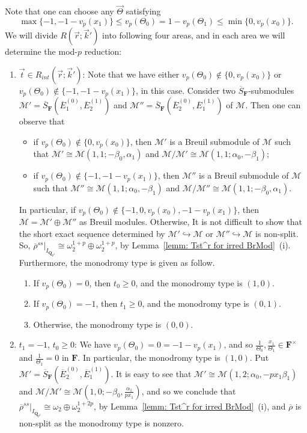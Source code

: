 \documentclass[11pt]{amsart}
\theoremstyle{definition}
\numberwithin{equation}{subsection}
\theoremstyle{plain}
\theoremstyle{plain}
\theoremstyle{plain}
\theoremstyle{plain}
\theoremstyle{plain}
\theoremstyle{plain}
\theoremstyle{plain}
\theoremstyle{plain}
\theoremstyle{plain}
\theoremstyle{plain}
\theoremstyle{plain}
\theoremstyle{plain}
\theoremstyle{definition}
\theoremstyle{definition}
\theoremstyle{definition}
\theoremstyle{remark}
\renewcommand{\(}{\textup{(}}
\renewcommand{\)}{\textup{)}}
\newcommand{\Q}{\mathbf{Q}}
\newcommand{\F}{\mathbf{F}}
\newcommand{\barS}{\overline{S}}
\newcommand{\rhobar}{\overline{\rho}}
\newcommand{\cM}{\mathcal{M}}
\newcommand{\barE}{\overline{E}}
\newcommand{\vr}{\vec{r}}
\newcommand{\vk}{\vec{k}}
\newcommand{\vTh}{\vec{\Theta}}
\newcommand{\IQptwo}{{I_{\Q_{p^2}}}}
\begin{document}
Note that one can choose any $\vTh$ satisfying
$$\max\{-1,-1-v_p(x_1)\}\leq v_p(\Theta_0)=1-v_p(\Theta_1)\leq \min\{0,v_p(x_0)\}.$$
We will divide $R(\vr;\vk')$ into following four areas, and in each area we will determine the mod-$p$ reduction:
\begin{enumerate}[leftmargin=*]
  \item $\vec{t}\in R_{int}(\vr;\vk')$: Note that we have either $v_p(\Theta_0)\not\in\{0,v_p(x_0)\}$ or $v_p(\Theta_0)\not\in\{-1,-1-v_p(x_1)\}$, in this case. Consider two $\barS_{\F}$-submodules    $\cM'=\barS_{\F}(\barE_1^{(0)},\barE_2^{(1)})$ and $\cM''=\barS_{\F}(\barE_2^{(0)},\barE_1^{(1)})$ of $\cM$. Then one can observe that
    \begin{itemize}[leftmargin=*]
      \item if $v_p(\Theta_0)\not\in\{0,v_p(x_0)\}$, then $\cM'$ is a Breuil submodule of $\cM$ such that $\cM'\cong\cM(1,1;-\beta_0,\alpha_1)$ and $\cM/\cM'\cong\cM(1,1;\alpha_0,-\beta_1)$;
      \item if $v_p(\Theta_0)\not\in\{-1,-1-v_p(x_1)\}$, then $\cM''$ is a Breuil submodule of $\cM$ such that $\cM''\cong\cM(1,1;\alpha_0,-\beta_1)$ and $\cM/\cM''\cong\cM(1,1;-\beta_0,\alpha_1)$.
    \end{itemize}
    In particular, if $v_p(\Theta_0)\not\in\{-1,0,v_p(x_0),-1-v_p(x_1)\}$, then $\cM=\cM'\oplus\cM''$ as Breuil modules. Otherwise, It is not difficult to show that the short exact sequence determined by $\cM'\hookrightarrow \cM$ or $\cM''\hookrightarrow\cM$ is non-split. So, $\rhobar^{ss}|_\IQptwo\cong\omega_2^{1+p}\oplus\omega_2^{1+p}$, by Lemma~\ref{lemm: Tst^r for irred BrMod}~(i). Furthermore, the monodromy type is given as follow.
    \begin{enumerate}[leftmargin=*]
      \item If $v_p(\Theta_0)=0$, then $t_0\geq 0$, and the monodromy type is $(1,0)$.
      \item If $v_p(\Theta_0)=-1$, then $t_1\geq 0$, and the monodromy type is $(0,1)$.
      \item Otherwise, the monodromy type is $(0,0)$.
    \end{enumerate}
  \item $t_1=-1$, $t_0\geq 0$: We have $v_p(\Theta_0)=0=-1-v_p(x_1)$, and so $\frac{1}{\Theta_0},\frac{x_1}{\Theta_1}\in\F^\times$ and $\frac{1}{\Theta_1}=0$ in $\F$. In particular, the monodromy type is $(1,0)$. Put $\cM'=\barS_{\F}(\barE_2^{(0)},\barE_1^{(1)})$. It is easy to see that $\cM'\cong\cM(1,2;\alpha_0,-px_1\beta_1)$ and $\cM/\cM'\cong\cM(1,0;-\beta_0,\frac{\alpha_1}{px_1})$, and so we conclude that $\rhobar^{ss}|_\IQptwo\cong\omega_2\oplus\omega_2^{1+2p}$, by Lemma~\ref{lemm: Tst^r for irred BrMod}~(i), and $\rhobar$ is non-split as the monodromy type is nonzero.

\end{enumerate}
\end{document}
